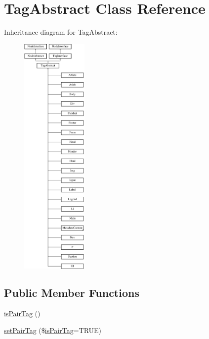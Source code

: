 \hypertarget{class_pes_1_1_dom_1_1_node_1_1_tag_1_1_tag_abstract}{}\section{Tag\+Abstract Class Reference}
\label{class_pes_1_1_dom_1_1_node_1_1_tag_1_1_tag_abstract}
Inheritance diagram for Tag\+Abstract\+:\begin{figure}[H]
\begin{center}
\leavevmode
\includegraphics[height=12.000000cm]{class_pes_1_1_dom_1_1_node_1_1_tag_1_1_tag_abstract}
\end{center}
\end{figure}
\subsection*{Public Member Functions}
\begin{DoxyCompactItemize}
\item 
\mbox{\hyperlink{class_pes_1_1_dom_1_1_node_1_1_tag_1_1_tag_abstract_a8d496f376687a9da8397563a92d43918}{is\+Pair\+Tag}} ()
\item 
\mbox{\hyperlink{class_pes_1_1_dom_1_1_node_1_1_tag_1_1_tag_abstract_aa3c8cc6b22e24f476f967c86284ab79c}{set\+Pair\+Tag}} (\$\mbox{\hyperlink{class_pes_1_1_dom_1_1_node_1_1_tag_1_1_tag_abstract_a8d496f376687a9da8397563a92d43918}{is\+Pair\+Tag}}=T\+R\+UE)
\end{DoxyCompactItemize}

